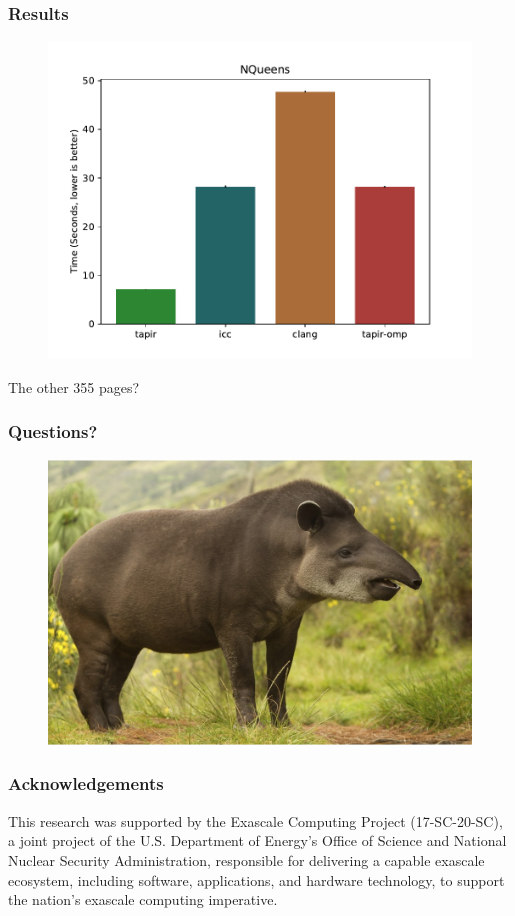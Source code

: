 \documentclass{beamer}
\begin{document}
\begin{frame}[fragile]
\frametitle{Results}
\begin{figure}
\includegraphics[width=0.7\linewidth]{nqueens}
\end{figure}
\end{frame}

\begin{frame}
\begin{center}
\huge{The other 355 pages?}
\end{center}
\end{frame}

\begin{frame}[fragile]
\frametitle{Questions?}
\begin{figure}
\includegraphics[width=0.8\linewidth]{tapir-side.jpg}
\end{figure}
\end{frame}

\begin{frame}[fragile]
\frametitle{Acknowledgements}
This research was supported by the Exascale Computing Project (17-SC-20-SC), a joint project of the U.S. Department of Energy’s Office of Science and National Nuclear Security Administration, responsible for delivering a capable exascale ecosystem, including software, applications, and hardware technology, to support the nation’s exascale computing imperative.
\end{frame}
\end{document}

